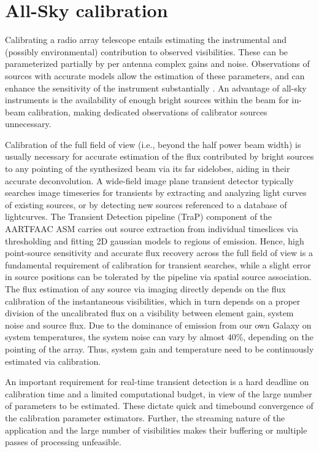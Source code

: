 \documentclass{aa}
\begin{document}
\section{\label{sec:Array-calibration-for}All-Sky calibration}
Calibrating  a radio  array telescope  entails estimating  the  instrumental and
(possibly environmental)  contribution to  observed visibilities.  These  can be
parameterized partially by per antenna  complex gains and noise. Observations of
sources with accurate  models allow the estimation of  these parameters, and can
enhance     the     sensitivity      of     the     instrument     substantially
\citep{taylor1999synthesis}.   An  advantage   of  all-sky  instruments  is  the
availability of enough  bright sources within the beam  for in-beam calibration,
making dedicated observations of calibrator sources unnecessary.

Calibration of the  full field of view (i.e., beyond the  half power beam width)
is usually necessary  for accurate estimation of the  flux contributed by bright
sources to any pointing of the synthesized beam via its far sidelobes, aiding in
their  accurate  deconvolution.  A  wide-field  image  plane transient  detector
typically searches  image timeseries for transients by  extracting and analyzing
light curves  of existing sources, or  by detecting new sources  referenced to a
database   of   lightcurves.     The   Transient   Detection   pipeline   (TraP)
\citep{swinbank2014trap}  component  of  the  AARTFAAC ASM  carries  out  source
extraction  from individual  timeslices via  thresholding and  fitting \mbox{2D}
gaussian models  to regions of  emission.  Hence, high  point-source sensitivity
and  accurate flux  recovery across  the  full field  of view  is a  fundamental
requirement  of calibration  for transient  searches,  while a  slight error  in
source  positions  can   be  tolerated  by  the  pipeline   via  spatial  source
association.  The flux estimation of  any source via imaging directly depends on
the flux calibration of the instantaneous visibilities, which in turn depends on
a proper division of the uncalibrated flux on a visibility between element gain,
system noise  and source flux.   Due to the  dominance of emission from  our own
Galaxy  on system  temperatures, the  system noise  can vary  by  almost $40\%$,
depending on the pointing of the  array.  Thus, system gain and temperature need
to be continuously estimated via calibration.

An important requirement for real-time transient detection is a hard deadline on
calibration time and a limited computational budget, in view of the large number
of parameters to be estimated.  These dictate quick and timebound convergence of
the  calibration parameter  estimators.  Further,  the streaming  nature  of the
application  and the  large  number  of visibilities  makes  their buffering  or
multiple passes of processing unfeasible.
\end{document}
